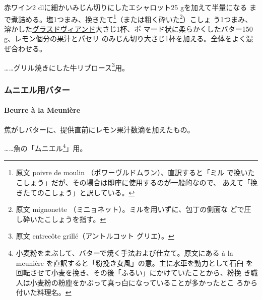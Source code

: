\begin{recette}

赤ワイン2 dlに細かいみじん切りにしたエシャロット25 gを加えて半量になる
まで煮詰める。塩1つまみ、挽きたて\footnote{原文 poivre de moulin
  （ポワーヴルドムラン）、直訳すると「ミル
  で挽いたこしょう」だが、その場合は即座に使用するのが一般的なので、
  あえて「挽きたてのこしょう」と訳している。}（または粗く砕いた\footnote{原文
  mignonette （ミニョネット）。ミルを用いずに、包丁の側面な
  どで圧し砕いたこしょうを指す。}）こしょ
う1つまみ、溶かした\protect\hyperlink{glace-de-viande}{グラスドヴィアンド}大さじ1杯、ポ
マード状に柔らかくしたバター150 g、レモン\unquart{}個分の果汁とパセリ
のみじん切り大さじ1杯を加える。全体をよく混ぜ合わせる。

\ldots{}\ldots{}グリル焼きにした牛リブロース\footnote{原文 entrecôte
  grillé（アントルコット グリエ）。}用。

\maeaki

\hypertarget{ux30e0ux30cbux30a8ux30ebux7528ux30d0ux30bfux30fc}{%
\subsubsection{ムニエル用バター}\label{ux30e0ux30cbux30a8ux30ebux7528ux30d0ux30bfux30fc}}

\hypertarget{beurre-a-la-meuniere}{%
\paragraph{Beurre à la Meunière}\label{beurre-a-la-meuniere}}


焦がしバターに、提供直前にレモン果汁数滴を加えたもの。

\ldots{}\ldots{}魚の「ムニエル\footnote{小麦粉をまぶして、バターで焼く手法および仕立て。原文にある
  à la meunière を直訳すると「粉挽き女風」の意。主に水車を動力として石臼
  を回転させて小麦を挽き、その後「ふるい」にかけていたことから、粉挽
  き職人は小麦粉の粉塵をかぶって真っ白になっていることが多かったとこ
  ろから付いた料理名。}」用。


\end{recette}
